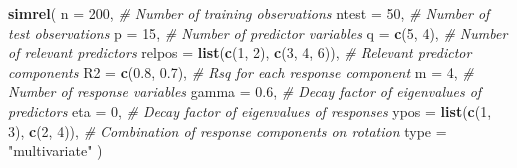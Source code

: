 \documentclass[review]{elsarticle}
\newenvironment{Shaded}{\begin{snugshade}}{\end{snugshade}}
\newcommand{\KeywordTok}[1]{\textcolor[rgb]{0.13,0.29,0.53}{\textbf{#1}}}
\newcommand{\DataTypeTok}[1]{\textcolor[rgb]{0.13,0.29,0.53}{#1}}
\newcommand{\DecValTok}[1]{\textcolor[rgb]{0.00,0.00,0.81}{#1}}
\newcommand{\FloatTok}[1]{\textcolor[rgb]{0.00,0.00,0.81}{#1}}
\newcommand{\StringTok}[1]{\textcolor[rgb]{0.31,0.60,0.02}{#1}}
\newcommand{\CommentTok}[1]{\textcolor[rgb]{0.56,0.35,0.01}{\textit{#1}}}
\newcommand{\NormalTok}[1]{#1}
\theoremstyle{definition}
\theoremstyle{definition}
\theoremstyle{definition}
\theoremstyle{remark}
\begin{document}
\begin{Shaded}
\begin{Highlighting}[]
\KeywordTok{simrel}\NormalTok{(}
  \DataTypeTok{n      =} \DecValTok{200}\NormalTok{, }\CommentTok{# Number of training observations}
  \DataTypeTok{ntest  =} \DecValTok{50}\NormalTok{, }\CommentTok{# Number of test observations}
  \DataTypeTok{p      =} \DecValTok{15}\NormalTok{, }\CommentTok{# Number of predictor variables}
  \DataTypeTok{q      =} \KeywordTok{c}\NormalTok{(}\DecValTok{5}\NormalTok{, }\DecValTok{4}\NormalTok{), }\CommentTok{# Number of relevant predictors}
  \DataTypeTok{relpos =} \KeywordTok{list}\NormalTok{(}\KeywordTok{c}\NormalTok{(}\DecValTok{1}\NormalTok{, }\DecValTok{2}\NormalTok{), }\KeywordTok{c}\NormalTok{(}\DecValTok{3}\NormalTok{, }\DecValTok{4}\NormalTok{, }\DecValTok{6}\NormalTok{)),}
         \CommentTok{# Relevant predictor components}
  \DataTypeTok{R2     =} \KeywordTok{c}\NormalTok{(}\FloatTok{0.8}\NormalTok{, }\FloatTok{0.7}\NormalTok{), }\CommentTok{# Rsq for each response component}
  \DataTypeTok{m      =} \DecValTok{4}\NormalTok{, }\CommentTok{# Number of response variables}
  \DataTypeTok{gamma  =} \FloatTok{0.6}\NormalTok{, }\CommentTok{# Decay factor of eigenvalues of predictors}
  \DataTypeTok{eta    =} \DecValTok{0}\NormalTok{, }\CommentTok{# Decay factor of eigenvalues of responses}
  \DataTypeTok{ypos   =} \KeywordTok{list}\NormalTok{(}\KeywordTok{c}\NormalTok{(}\DecValTok{1}\NormalTok{, }\DecValTok{3}\NormalTok{), }\KeywordTok{c}\NormalTok{(}\DecValTok{2}\NormalTok{, }\DecValTok{4}\NormalTok{)),}
         \CommentTok{# Combination of response components on rotation}
  \DataTypeTok{type   =} \StringTok{"multivariate"}
\NormalTok{)}
\end{Highlighting}
\end{Shaded}
\end{document}
